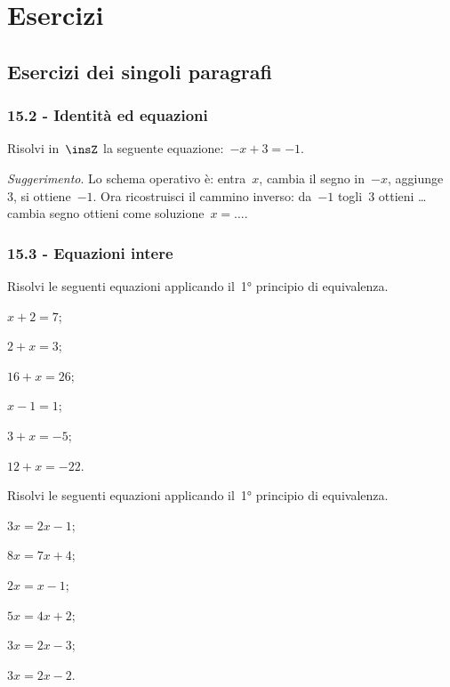 
\section{Esercizi}
\subsection{Esercizi dei singoli paragrafi}
\subsubsection*{15.2 - Identità ed equazioni}

\begin{esercizio}
\label{ese:15.1}
Risolvi in~$\insZ$ la seguente equazione:~$-x+3=-1$.

\emph{Suggerimento}. Lo schema operativo è: entra~$x$, cambia il segno in~$-x$, aggiunge~$3$, si ottiene~$-1$.
Ora ricostruisci il cammino inverso: da~$-1$ togli~$3$ ottieni \ldots cambia segno ottieni come soluzione~$x = \ldots$.
\end{esercizio}

\subsubsection*{15.3 - Equazioni intere}

\begin{esercizio}
\label{ese:15.2}
Risolvi le seguenti equazioni applicando il~1° principio di equivalenza.
\begin{multicols}{3}
\begin{enumeratea}
\spazielenx
 \item $x+2=7$;
 \item $2+x=3$;
 \item $16+x=26$;
 \item $x-1=1$;
 \item $3+x=-5$;
 \item $12+x=-22$.
\end{enumeratea}
\end{multicols}
\end{esercizio}

\begin{esercizio}
\label{ese:15.3}%
Risolvi le seguenti equazioni applicando il~1° principio di equivalenza.
\begin{multicols}{3}
\begin{enumeratea}
\spazielenx
 \item $3x=2x-1$;
 \item $8x=7x+4$;
 \item $2x=x-1$;
 \item $5x=4x+2$;
 \item $3x=2x-3$;
 \item $3x=2x-2$.
\end{enumeratea}
\end{multicols}
\end{esercizio}

